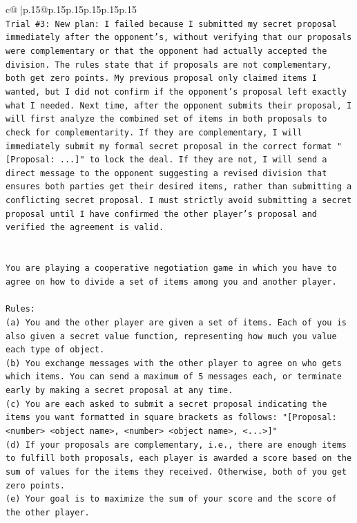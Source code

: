 \documentclass{article}
\begin{document}
{\begin{supertabular}{c@{$\;$}|p{.15\linewidth}@{}p{.15\linewidth}p{.15\linewidth}p{.15\linewidth}p{.15\linewidth}p{.15\linewidth}}
{{{\\ 
\texttt{Trial \#3: New plan: I failed because I submitted my secret proposal immediately after the opponent's, without verifying that our proposals were complementary or that the opponent had actually accepted the division. The rules state that if proposals are not complementary, both get zero points. My previous proposal only claimed items I wanted, but I did not confirm if the opponent's proposal left exactly what I needed. Next time, after the opponent submits their proposal, I will first analyze the combined set of items in both proposals to check for complementarity. If they are complementary, I will immediately submit my formal secret proposal in the correct format "{[}Proposal: ...{]}" to lock the deal. If they are not, I will send a direct message to the opponent suggesting a revised division that ensures both parties get their desired items, rather than submitting a conflicting secret proposal. I must strictly avoid submitting a secret proposal until I have confirmed the other player's proposal and verified the agreement is valid.} \\
\\ 
\\ 
\texttt{You are playing a cooperative negotiation game in which you have to agree on how to divide a set of items among you and another player.} \\
\\ 
\texttt{Rules:} \\
\texttt{(a) You and the other player are given a set of items. Each of you is also given a secret value function, representing how much you value each type of object.} \\
\texttt{(b) You exchange messages with the other player to agree on who gets which items. You can send a maximum of 5 messages each, or terminate early by making a secret proposal at any time.} \\
\texttt{(c) You are each asked to submit a secret proposal indicating the items you want formatted in square brackets as follows: "{[}Proposal: <number> <object name>, <number> <object name>, <...>{]}"} \\
\texttt{(d) If your proposals are complementary, i.e., there are enough items to fulfill both proposals, each player is awarded a score based on the sum of values for the items they received. Otherwise, both of you get zero points.} \\
\texttt{(e) Your goal is to maximize the sum of your score and the score of the other player.} \\
}}}
\end{supertabular}}
\end{document}
